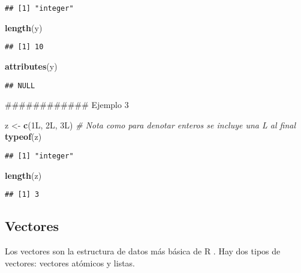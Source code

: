 \documentclass[]{article}
\newenvironment{Shaded}{\begin{snugshade}}{\end{snugshade}}
\newcommand{\KeywordTok}[1]{\textcolor[rgb]{0.13,0.29,0.53}{\textbf{#1}}}
\newcommand{\StringTok}[1]{\textcolor[rgb]{0.31,0.60,0.02}{#1}}
\newcommand{\CommentTok}[1]{\textcolor[rgb]{0.56,0.35,0.01}{\textit{#1}}}
\newcommand{\NormalTok}[1]{#1}
\begin{document}
\begin{verbatim}
## [1] "integer"
\end{verbatim}

\begin{Shaded}
\begin{Highlighting}[]
\KeywordTok{length}\NormalTok{(y)}
\end{Highlighting}
\end{Shaded}

\begin{verbatim}
## [1] 10
\end{verbatim}

\begin{Shaded}
\begin{Highlighting}[]
\KeywordTok{attributes}\NormalTok{(y)}
\end{Highlighting}
\end{Shaded}

\begin{verbatim}
## NULL
\end{verbatim}

\begin{Shaded}
\begin{Highlighting}[]
\NormalTok{############ Ejemplo 3}

\NormalTok{z <-}\StringTok{ }\KeywordTok{c}\NormalTok{(1L, 2L, 3L) }\CommentTok{# Nota como para denotar enteros se incluye una L al final}
\KeywordTok{typeof}\NormalTok{(z)}
\end{Highlighting}
\end{Shaded}

\begin{verbatim}
## [1] "integer"
\end{verbatim}

\begin{Shaded}
\begin{Highlighting}[]
\KeywordTok{length}\NormalTok{(z)}
\end{Highlighting}
\end{Shaded}

\begin{verbatim}
## [1] 3
\end{verbatim}

\subsection{Vectores}\label{vectores}

Los vectores son la estructura de datos más básica de R
\parencite{wickham2014advanced}. Hay dos tipos de vectores: vectores
atómicos y listas.
\end{document}
